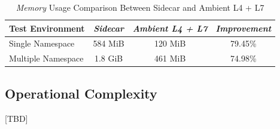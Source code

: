 \begin{table}[ht!]
  \centering
  \begin{tabular}{ |l|c|c|c| }
    \hline
    \textbf{Test Environment} & \textbf{\textit{Sidecar}} & \textbf{\textit{Ambient L4 + L7}} & \textbf{\textit{Improvement}}\\ \hline
    Single Namespace & 584 MiB & 120 MiB & 79.45\% \\ \hline
    Multiple Namespace & 1.8 GiB & 461 MiB & 74.98\% \\ \hline
  \end{tabular}
  \caption{\textit{Memory} Usage Comparison Between Sidecar and Ambient L4 + L7}
  \label{sidecarMemVsL4L7}
\end{table}

\subsection{Operational Complexity}
[TBD]
